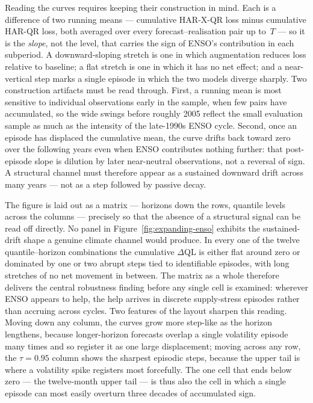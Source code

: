 Reading the curves requires keeping their construction in mind. Each is a
difference of two running means --- cumulative HAR-X-QR loss minus
cumulative HAR-QR loss, both averaged over every forecast--realisation
pair up to~$T$ --- so it is the \emph{slope}, not the level, that carries
the sign of ENSO's contribution in each subperiod. A downward-sloping
stretch is one in which augmentation reduces loss relative to baseline; a
flat stretch is one in which it has no net effect; and a near-vertical
step marks a single episode in which the two models diverge sharply. Two
construction artifacts must be read through. First, a running mean is most
sensitive to individual observations early in the sample, when few pairs
have accumulated, so the wide swings before roughly 2005 reflect the small
evaluation sample as much as the intensity of the late-1990s ENSO cycle.
Second, once an episode has displaced the cumulative mean, the curve drifts
back toward zero over the following years even when ENSO contributes
nothing further: that post-episode slope is dilution by later
near-neutral observations, not a reversal of sign. A structural channel
must therefore appear as a sustained downward drift across many years ---
not as a step followed by passive decay.

The figure is laid out as a matrix --- horizons down the rows, quantile
levels across the columns --- precisely so that the absence of a
structural signal can be read off directly. No panel in
Figure~\ref{fig:expanding-enso} exhibits the sustained-drift shape a
genuine climate channel would produce.
In every one of the twelve quantile--horizon combinations the cumulative
$\Delta$QL is either flat around zero or dominated by one or two abrupt
steps tied to identifiable episodes, with long stretches of no net
movement in between. The matrix as a whole therefore delivers the central
robustness finding before any single cell is examined: wherever ENSO
appears to help, the help arrives in discrete supply-stress episodes
rather than accruing across cycles. Two features of the layout sharpen
this reading. Moving down any column, the curves grow more step-like as
the horizon lengthens, because longer-horizon forecasts overlap a single
volatility episode many times and so register it as one large
displacement; moving across any row, the $\tau = 0.95$ column shows the
sharpest episodic steps, because the upper tail is where a volatility
spike registers most forcefully. The one cell that ends below zero --- the
twelve-month upper tail --- is thus also the cell in which a single
episode can most easily overturn three decades of accumulated sign.

